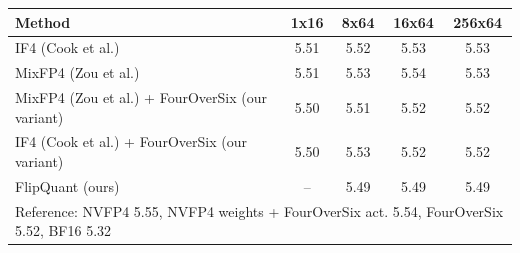 \begin{tabular}{lcccc}
\toprule
Method & 1x16 & 8x64 & 16x64 & 256x64 \\
\midrule
IF4 (Cook et al.) & 5.51 & 5.52 & 5.53 & 5.53 \\
MixFP4 (Zou et al.) & 5.51 & 5.53 & 5.54 & 5.53 \\
MixFP4 (Zou et al.) + FourOverSix (our variant) & 5.50 & 5.51 & 5.52 & 5.52 \\
IF4 (Cook et al.) + FourOverSix (our variant) & 5.50 & 5.53 & 5.52 & 5.52 \\
FlipQuant (ours) & -- & 5.49 & 5.49 & 5.49 \\
\midrule
\multicolumn{5}{l}{\footnotesize Reference: NVFP4 5.55, NVFP4 weights + FourOverSix act. 5.54, FourOverSix 5.52, BF16 5.32} \\
\bottomrule
\end{tabular}
